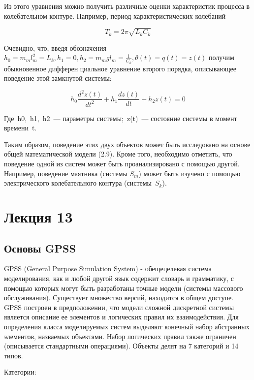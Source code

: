 \documentclass[14pt]{extarticle}
\begin{document}
Из этого уравнения можно получить различные оценки харак­теристик процесса в колебательном контуре. Например, период характеристических колебаний

\begin{equation}
	T_k = 2\pi \sqrt{L_kC_k}
\end{equation}

Очевидно, что, введя обозначения $h_0 = m_ml_m^2= L_k, h_1 = 0, h_2 = m_mgl_m= \frac{1}{C_k}, \theta(t) = q(t) = z(t)$ получим обыкновенное дифферен­ циальное уравнение второго порядка, описывающее поведение этой замкнутой системы:

\begin{equation}
h_0 \frac{d^2z(t)}{dt^2} + h_1 \frac{dz(t)}{dt} + h_2 z(t) = 0	
\end{equation}

Где h0, h1, h2 — параметры системы; z(t) — состояние системы в момент времени t.

Таким образом, поведение этих двух объектов может быть исследовано на основе общей математической модели (2.9). Кроме того, необходимо отметить, что поведение одной из систем может быть проанализировано с помощью другой. Например, поведение маятника (системы $S_m$) может быть изучено с помощью электричес­кого колебательного контура (системы $S_k$).

\newpage

\section*{Лекция 13}

\subsection*{Основы GPSS}

GPSS (General Purpose Simulation System) - обещецелевая система моделирования, как и любой другой язык содержит словарь и грамматику, с помощью которых могут быть разработаны точные модели (системы массового обслуживания). Существует множество версий, находится в общем доступе. GPSS построен в предположении, что модели сложной дискретной системы является описание ее элементов и логических правил их взаимодействия. Для определения класса моделируемых систем выделяют конечный набор абстранных элементов, назваемых объектами. Набор логических правил также ограничен (описывается стандартными операциями). Объекты делят на 7 категорий и 14 типов.

Категории:
\end{document}
